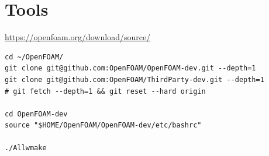 \documentclass{blog}
\begin{document}
\appendix
\section{Tools}
\begin{definition}[installation]
    \url{https://openfoam.org/download/source/}
    \small
    \begin{verbatim}
cd ~/OpenFOAM/
git clone git@github.com:OpenFOAM/OpenFOAM-dev.git --depth=1
git clone git@github.com:OpenFOAM/ThirdParty-dev.git --depth=1
# git fetch --depth=1 && git reset --hard origin

cd OpenFOAM-dev
source "$HOME/OpenFOAM/OpenFOAM-dev/etc/bashrc"

./Allwmake
\end{verbatim}
\end{definition}

\printbibliography
\end{document}
